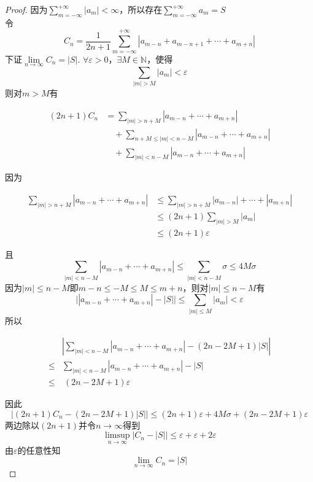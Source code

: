\begin{proof}

    因为$\sum\limits_{m = -\infty}^{+\infty}{|a_m|} < \infty$，所以存在$\sum\limits_{m = -\infty}^{+\infty}{a_m} = S$ \\
    令
    \[C_n = \dfrac{1}{2n + 1}\sum\limits_{m = -\infty}^{+\infty}{|a_{m - n} + a_{m - n + 1} + \cdots + a_{m + n}|}\]
    下证$\lim\limits_{n \to \infty}{C_n} = |S|$. $\forall \varepsilon > 0$，$\exists M \in \mathbb{N}$，使得
    \[\sum\limits_{|m| > M}{|a_m|} < \varepsilon\]
    则对$m > M$有

    \begin{align*}
        (2n + 1)C_n & = \sum\limits_{|m| > n + M}{|a_{m - n} + \cdots + a_{m + n}|} \\
        & \quad + \sum\limits_{n + M \leq |m| < n - M}{|a_{m - n} + \cdots + a_{m + n}|} \\
        & \quad + \sum\limits_{|m| < n - M}{|a_{m - n} + \cdots + a_{m + n}|}
    \end{align*}

    因为

    \begin{align*}
        \sum\limits_{|m| > n + M}{|a_{m - n} + \cdots + a_{m + n}|} & \leq \sum\limits_{|m| > n + M}{|a_{m - n}| + \cdots + |a_{m + n}|} \\
        & \leq (2n + 1)\sum\limits_{|m| > M}{|a_m|} \\
        & \leq (2n + 1)\varepsilon
    \end{align*}

    且
    \[\sum\limits_{|m| < n - M}{|a_{m - n} + \cdots + a_{m + n}|} \leq \sum\limits_{|m| < n - M}{\sigma} \leq 4M\sigma\]
    因为$|m| \leq n - M$即$m - n \leq -M \leq M \leq m + n$，则对$|m| \leq n - M$有
    \[\Big| |a_{m - n} + \cdots + a_{m + n}| - |S| \Big| \leq \sum\limits_{|m| \leq M}{|a_m|} < \varepsilon\]
    所以

    \begin{align*}
        & \left| \sum\limits_{|m| < n - M}{|a_{m - n} + \cdots + a_{m + n}|} - (2n - 2M + 1)|S| \right| \\
        \leq & \sum\limits_{|m| < n - M}{|a_{m - n} + \cdots + a_{m + n}| - |S|} \\
        \leq & \ (2n - 2M + 1)\varepsilon        
    \end{align*}

    因此
    \[\Big| (2n + 1)C_n - (2n - 2M + 1)|S| \Big| \leq (2n + 1)\varepsilon + 4M\sigma + (2n - 2M + 1)\varepsilon\]
    两边除以$(2n + 1)$并令$n \to \infty$得到
    \[\limsup\limits_{n \to \infty}{\Big|C_n - |S|\Big|} \leq \varepsilon + \varepsilon + 2\varepsilon\]
    由$\varepsilon$的任意性知
    \[\lim\limits_{n \to \infty}{C_n} = |S|\]

\end{proof}

